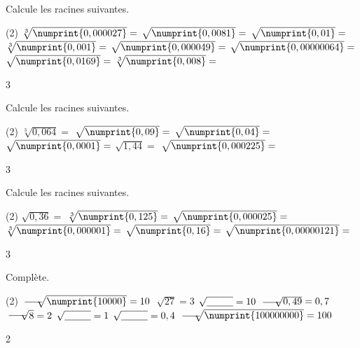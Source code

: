 \documentclass[a4paper,11pt]{report}
\begin{document}
\newpage
\begin{exop}{ 
Calcule les racines suivantes.
\begin{tasks}(2)
    \task $\sqrt[3]{\numprint{0,000027}}=$
    \task $\sqrt{\numprint{0,0081}}=$
    \task $\sqrt{\numprint{0,01}}=$
    \task $\sqrt[3]{\numprint{0,001}}=$
    \task $\sqrt{\numprint{0,000049}}=$
    \task $\sqrt{\numprint{0,00000064}}=$
    \task $\sqrt{\numprint{0,0169}}=$
    \task $\sqrt[3]{\numprint{0,008}}=$
\end{tasks}
}{3}
\end{exop}


\begin{exop}{ 
Calcule les racines suivantes.
\begin{tasks}(2)
    \task $\sqrt[3]{0,064}=$
    \task $\sqrt{\numprint{0,09}}=$
    \task $\sqrt{\numprint{0,04}}=$
    \task $\sqrt{\numprint{0,0001}}=$
    \task $\sqrt{1,44}=$
    \task $\sqrt{\numprint{0,000225}}=$
    
\end{tasks}
}{3}
\end{exop}


\begin{exop}{ 
Calcule les racines suivantes.
\begin{tasks}(2)
    \task $\sqrt{0,36}=$
    \task $\sqrt[3]{\numprint{0,125}}=$
    \task $\sqrt{\numprint{0,000025}}=$
    \task $\sqrt[3]{\numprint{0,000001}}=$
    \task $\sqrt{\numprint{0,16}}=$
    \task $\sqrt{\numprint{0,00000121}}=$
\end{tasks}
}{3}
\end{exop}
\newpage
\begin{exop}{
Complète.
\begin{tasks}(2)
    \task $\sqrt[\underline{{\color{white}XXX}}]{\numprint{10000}}=10$
    \task $\sqrt[\underline{~~~~}]{27}=3$
    \task $\sqrt{\underline{{\color{white}XXX}}}=10$
    \task $\sqrt[\underline{{\color{white}XXX}}]{0,49}=0,7$
    \task $\sqrt[\underline{{\color{white}XXX}}]{8}=2$
    \task $\sqrt{\underline{{\color{white}XXX}}}=1$
    \task $\sqrt{\underline{{\color{white}XXX}}}=0,4$
    \task $\sqrt[\underline{{\color{white}XXX}}]{\numprint{100000000}}=100$
\end{tasks}
}{2}    
\end{exop}
\end{document}
